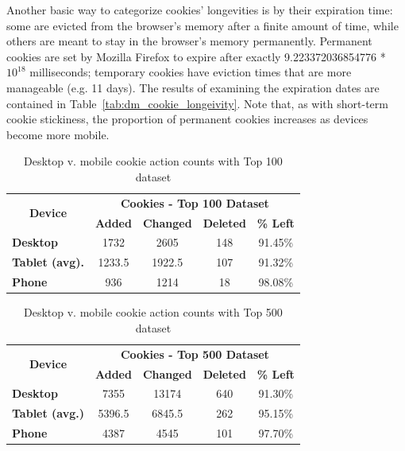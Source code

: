 \documentclass{acm_proc_article-sp}
\begin{document}
Another basic way to categorize cookies' longevities is by their expiration time: some are evicted from the browser's memory after a finite amount of time, while others are meant to stay in the browser's memory permanently. Permanent cookies are set by Mozilla Firefox to expire after exactly 9.223372036854776 * $10^{18}$ milliseconds; temporary cookies have eviction times that are more manageable (e.g. 11 days). The results of examining the expiration dates are contained in Table~\ref{tab:dm_cookie_longeivity}. Note that, as with short-term cookie stickiness, the proportion of permanent cookies increases as devices become more mobile.


\begin{table}[htbp]
  \centering
  \caption{Desktop v. mobile cookie action counts with Top 100 dataset}
    \begin{tabular}{|c|c|c|c|c|}
    \hline
    \multicolumn{1}{|c|}{\multirow{2}[4]{*}{\textbf{Device}}} & \multicolumn{4}{|c|}{\textbf{Cookies - Top 100 Dataset}} \\ \cline{2-5}
    \multicolumn{1}{|c|}{} & \multicolumn{1}{|c|}{\textbf{Added}} & \multicolumn{1}{|c|}{\textbf{Changed}} & \multicolumn{1}{|c|}{\textbf{Deleted}} & \multicolumn{1}{|c|}{\textbf{\% Left}}\\ \hline
    \multicolumn{1}{|l|}{\textbf{Desktop}} & 1732   & 2605  & 148 & 91.45\% \\
    \multicolumn{1}{|l|}{\textbf{Tablet (avg).}} & 1233.5  & 1922.5  & 107 & 91.32\%\\
    \multicolumn{1}{|l|}{\textbf{Phone}} & 936   & 1214  & 18 & 98.08\% \\ \hline
    \end{tabular}%
  \label{tab:dm_cookie_counts_100}%
\end{table}%

\begin{table}[htbp]
  \centering
  \caption{Desktop v. mobile cookie action counts with Top 500 dataset}
    \begin{tabular}{|c|c|c|c|c|}
    \hline
    \multicolumn{1}{|c|}{\multirow{2}[4]{*}{\textbf{Device}}} & \multicolumn{4}{|c|}{\textbf{Cookies - Top 500 Dataset}} \\ \cline{2-5}
    \multicolumn{1}{|c|}{} & \multicolumn{1}{|c|}{\textbf{Added}} & \multicolumn{1}{|c|}{\textbf{Changed}} & \multicolumn{1}{|c|}{\textbf{Deleted}} & \multicolumn{1}{|c|}{\textbf{\% Left}}\\ \hline
\multicolumn{1}{|l|}{\textbf{Desktop}} & 7355  & 13174  & 640 & 91.30\%\\
    \multicolumn{1}{|l|}{\textbf{Tablet (avg.)}} & 5396.5  & 6845.5  & 262 & 95.15\%\\
    \multicolumn{1}{|l|}{\textbf{Phone}} & 4387  & 4545  & 101 & 97.70\%\\ \hline
    \end{tabular}%
  \label{tab:dm_cookie_counts_500}%
\end{table}%
\end{document}
